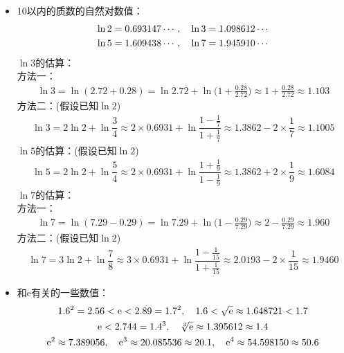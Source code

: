 \begin{itemize}[leftmargin=\inteval{\myitemleftmargin}pt,itemsep=
   \inteval{\myitemitempsep}pt,topsep=\inteval{\myitemtopsep}pt]
\item 10以内的质数的自然对数值：
\begin{gather*}
    \ln2=0.693147\cdots,\quad \ln3=1.098612\cdots \\
    \ln5=1.609438\cdots,\quad \ln7=1.945910\cdots
\end{gather*}
$ \ln 3 $的估算：\\
方法一：
\begin{align}
    \ln 3 =\ln(2.72+0.28)=\ln 2.72+\ln\Big(1+\frac{0.28}{2.72}\Big)
    \approx 1+\frac{0.28}{2.72}\approx 1.103  
\end{align}
方法二：(假设已知$ \ln 2 $)
\begin{align*}
    \ln 3=2\ln 2+\ln \dfrac{3}{4}\approx 2\times 0.6931+
    \ln\dfrac{1-\frac{1}{7}}{1+\frac{1}{7}}\approx 
    1.3862-2\times\dfrac{1}{7}\approx 1.1005
\end{align*}
$ \ln 5 $的估算：(假设已知$ \ln 2 $)
\begin{align*}
    \ln 5=2\ln 2+\ln \dfrac{5}{4}\approx 2\times 0.6931+
    \ln\dfrac{1+\frac{1}{9}}{1-\frac{1}{9}}\approx 
    1.3862+2\times\dfrac{1}{9}\approx 1.6084
\end{align*}
$ \ln 7 $的估算：\\
方法一：
\begin{align*}
    \ln 7 =\ln(7.29-0.29)=\ln7.29+\ln\Big(1-\frac{0.29}{7.29}\Big)
    \approx 2-\frac{0.29}{7.29}\approx 1.960 \label{ln7估算方法}
\end{align*}
方法二：(假设已知$ \ln 2 $)
\begin{align*}
    \ln 7=3\ln 2+\ln \dfrac{7}{8}\approx 3\times 0.6931+
    \ln\dfrac{1-\frac{1}{15}}{1+\frac{1}{15}}\approx 
    2.0193-2\times\dfrac{1}{15}\approx 1.9460
\end{align*}

\item 和e有关的一些数值：
\begin{gather*}
    1.6^2=2.56<\mathrm{e}<2.89=1.7^2,\quad 1.6<\sqrt{\mathrm{e}}\approx 1.648721<1.7 \\
    \mathrm{e}<2.744=1.4^3,\quad \sqrt[3]{\mathrm{e}}\approx 1.395612\approx 1.4 \\    
    \mathrm{e}^2\approx 7.389056,\quad  \mathrm{e}^3\approx 20.085536\approx 20.1 ,
    \quad \mathrm{e}^4\approx 54.598150\approx 50.6    
\end{gather*}


\end{itemize}
